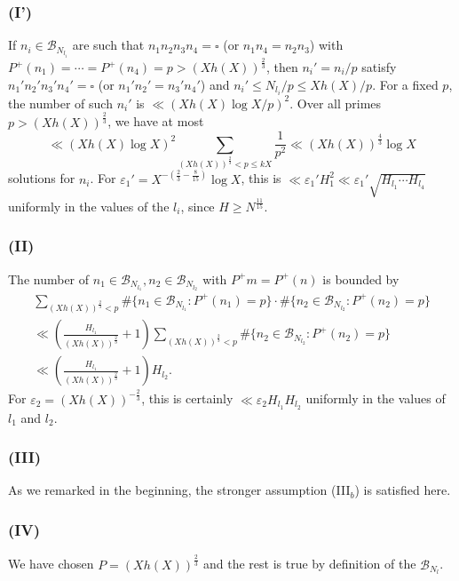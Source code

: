 \documentclass[11pt]{tran-l}
\theoremstyle{definition}
\theoremstyle{remark}
\numberwithin{equation}{section}
\begin{document}
\subsubsection*{(I')}  If $n_i\in\mathcal B_{N_{l_i}}$ are such that $n_1n_2n_3n_4 = \square$ (or $n_1n_4 = n_2n_3$) with $P^+(n_1) = \cdots = P^+(n_4)=p > (Xh(X))^{\frac{2}{3}}$, then $n_i' = n_i/p$ satisfy $n_1'n_2'n_
  3'n_4'=\square$ (or $n_1'n_2' = n_3'n_4'$) and $n_i'\leq N_{l_i}/p\leq Xh(X)/p$. For a fixed $p$, the number of such $n_i'$ is $\ll (Xh(X)\log X/p)^2$. Over all primes $p>(Xh(X))^{\frac{2}{3}}$, we have at most 
\begin{equation*}
    \ll (Xh(X)\log X)^2 \sum_{(Xh(X))^{\frac{2}{3}}<p\leq kX}\frac{1}{p^2}\ll (Xh(X))^{\frac{4}{3}}\log X
\end{equation*}
solutions for $n_i$. For  $\varepsilon_1' = X^{-(\frac{2}{3} - \frac{8}{15})}\log X$, this is $\ll \varepsilon_1' H_1^2\ll \varepsilon_1'\sqrt{H_{l_1}\cdots H_{l_4}}$ uniformly in the values of the $l_i$, since $H\geq N^{\frac{11}{15}}.$

\subsubsection*{(II)} The number of $n_1\in\mathcal B_{N_{l_1}}, n_2\in\mathcal B_{N_{l_2}}$ with $P^+m=P^+(n)$ is bounded by 
\begin{multline*}
    \sum_{(Xh(X))^{\frac{2}{3}}<p} \#\{n_1\in\mathcal B_{N_{l_1}} : P^+(n_1) = p \} \cdot \#\{n_2\in\mathcal B_{N_{l_2}} : P^+(n_2) = p \}  \\ \ll \left(\frac{H_{l_1}}{(Xh(X))^{\frac{2}{3}}} + 1\right)\sum_{(Xh(X))^{\frac{2}{3}}<p} \#\{n_2\in\mathcal B_{N_{l_2}} : P^+(n_2) = p \} \\  \ll \left(\frac{H_{l_1}}{(Xh(X))^{\frac{2}{3}}} + 1 \right)H_{l_2}.
\end{multline*}
For $\varepsilon_2 = (Xh(X))^{-\frac{2}{3}}$, this is certainly $\ll \varepsilon_2 H_{l_1}H_{l_2}$ uniformly in the values of $l_1$ and $l_2$. 

\subsubsection*{(III)} As we remarked in the beginning, the stronger assumption (III$_b$) is satisfied here. 

\subsubsection*{(IV)} We have chosen $P = (Xh(X))^{\frac{2}{3}}$ and the rest is true by definition of the $\mathcal B_{N_l}$. 
\end{document}
